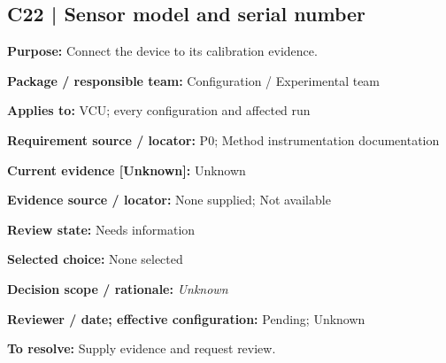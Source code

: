 \documentclass[11pt]{article}
\begin{document}
\par\noindent\begin{minipage}{\textwidth}\small\setlength{\parskip}{2pt}
\subsection*{C22 | Sensor model and serial number}
\textbf{Purpose:} Connect the device to its calibration evidence.\par
\textbf{Package / responsible team:} Configuration / Experimental team\par
\textbf{Applies to:} VCU; every configuration and affected run\par
\textbf{Requirement source / locator:} P0; Method instrumentation documentation\par
\textbf{Current evidence [Unknown]:} Unknown\par
\textbf{Evidence source / locator:} None supplied; Not available\par
\textbf{Review state:} Needs information\par
\textbf{Selected choice:} None selected\par
\textbf{Decision scope / rationale:} \textit{Unknown}\par
\textbf{Reviewer / date; effective configuration:} Pending; Unknown\par
\textbf{To resolve:} Supply evidence and request review.\par
\end{minipage}\par\vspace{5pt}
\end{document}
